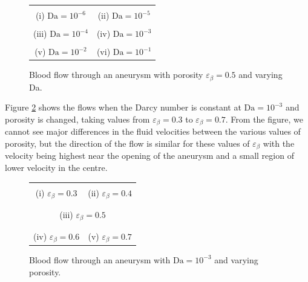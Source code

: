 \documentclass[a4paper, 11pt]{report}
\begin{document}
\begin{figure}[p]
    \centering
    \begin{tabular}{c c}
      &  \\
    (i) $\mathrm{Da}=10^{-6}$ & (ii) $\mathrm{Da}=10^{-5}$ \\
      &  \\
    (iii) $\mathrm{Da}=10^{-4}$ & (iv) $\mathrm{Da}=10^{-3}$ \\
      &  \\
    (v) $\mathrm{Da}=10^{-2}$ & (vi) $\mathrm{Da}=10^{-1}$
    \end{tabular}
    \caption{Blood flow through an aneurysm with porosity $\varepsilon_\beta=0.5$ and varying Da.} \label{fig:an_Da}
\end{figure}

Figure \ref{fig:an_eps} shows the flows when the Darcy number is constant at $\mathrm{Da}=10^{-3}$ and porosity is changed, taking values from $\varepsilon_\beta=0.3$ to $\varepsilon_\beta=0.7$. From the figure, we cannot see major differences in the fluid velocities between the various values of porosity, but the direction of the flow is similar for these values of $\varepsilon_\beta$ with the velocity being highest near the opening of the aneurysm and a small region of lower velocity in the centre. 

\begin{figure}[p]
    \centering
    \begin{tabular}{c c}
    &\\
    (i) $\varepsilon_\beta = 0.3$ & (ii) $\varepsilon_\beta = 0.4$ \\
    & \\ [-2ex]
    \multicolumn{2}{c}{}\\
    \multicolumn{2}{c}{(iii) $\varepsilon_\beta = 0.5$}\\
    & \\ [-2ex]
    &\\
    (iv) $\varepsilon_\beta = 0.6$ & (v) $\varepsilon_\beta = 0.7$
    \end{tabular}
    
    \caption{Blood flow through an aneurysm with $\mathrm{Da}=10^{-3}$ and varying porosity.} \label{fig:an_eps}
\end{figure}
\end{document}
